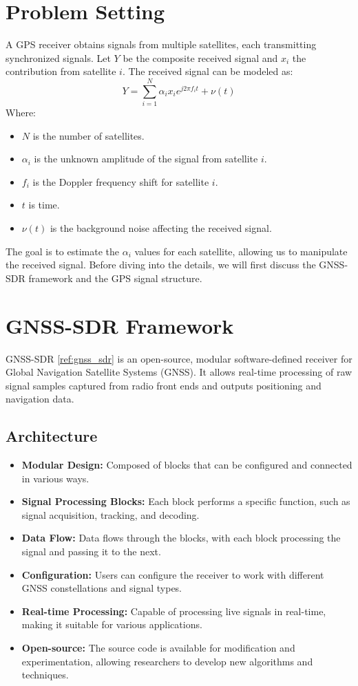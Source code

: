 \documentclass[12pt]{report}
\begin{document}
\section{Problem Setting}
A GPS receiver obtains signals from multiple satellites, each transmitting synchronized signals. 
Let $Y$ be the composite received signal and $x_i$ the contribution from satellite $i$. 
The received signal can be modeled as:
\begin{equation}
Y = \sum_{i=1}^{N} \alpha_i x_i e^{j2\pi f_i t} + \nu(t)
\end{equation}
Where:
\begin{itemize}
  \item $N$ is the number of satellites.
  \item $\alpha_i$ is the unknown amplitude of the signal from satellite $i$.
  \item $f_i$ is the Doppler frequency shift for satellite $i$.
  \item $t$ is time.
  \item $\nu(t)$ is the background noise affecting the received signal.
\end{itemize}
The goal is to estimate the $\alpha_i$ values for each satellite, allowing us to manipulate the received signal.
Before diving into the details, we will first discuss the GNSS-SDR framework and the GPS signal structure.
\section{GNSS-SDR Framework}
GNSS-SDR \ref{ref:gnss_sdr}  is an open-source, modular software-defined receiver for Global Navigation Satellite Systems (GNSS). 
It allows real-time processing of raw signal samples captured from radio front ends and outputs positioning and navigation data.
\subsection{Architecture}
\begin{itemize}
  \item \textbf{Modular Design:} Composed of blocks that can be configured and connected in various ways.
  \item \textbf{Signal Processing Blocks:} Each block performs a specific function, such as signal acquisition, tracking, and decoding.
  \item \textbf{Data Flow:} Data flows through the blocks, with each block processing the signal and passing it to the next.
  \item \textbf{Configuration:} Users can configure the receiver to work with different GNSS constellations and signal types.
  \item \textbf{Real-time Processing:} Capable of processing live signals in real-time, making it suitable for various applications.
  \item \textbf{Open-source:} The source code is available for modification and experimentation, allowing researchers to develop new algorithms and techniques.
\end{itemize}
\end{document}
